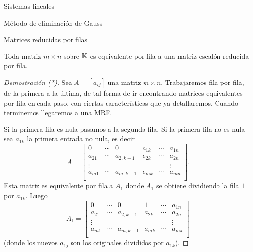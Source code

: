 \begin{chapter}{Sistemas lineales}
\begin{section}{Método de eliminación de Gauss }
\begin{subsection}{Matrices reducidas por filas}
                \begin{teorema}\label{th-merf}
                    Toda matriz $m \times n$ sobre $\mathbb K$ es equivalente por fila a una matriz escalón reducida por fila.
                \end{teorema}
                \begin{proof}[Demostración (*)]
                    Sea $A = [a_{ij}]$ una matriz $m \times n$. Trabajaremos fila por fila, de la primera a la última, de tal forma de ir encontrando matrices equivalentes por fila en cada paso, con ciertas características que ya detallaremos. Cuando terminemos llegaremos a una MRF.  
                    
                    Si la primera fila es nula pasamos a la segunda fila. Si la primera fila no es nula sea $a_{1k}$ la primera entrada no nula, es decir
                    \begin{equation*}
                    A = \begin{bmatrix}
                    0 & \cdots & 0 & a_{1k} & \cdots & a_{1n} \\
                    a_{21}& \cdots & a_{2,k-1} & a_{2k} & \cdots & a_{2n} \\
                    \vdots&  &  &  &  & \vdots \\
                    a_{m1}& \cdots & a_{m,k-1} & a_{mk} & \cdots & a_{mn} \\
                    \end{bmatrix}.
                    \end{equation*} 
                    Esta matriz es equivalente por fila a $A_1$ donde $A_1$ se obtiene dividiendo la fila $1$ por $a_{1k}$. Luego 
                    \begin{equation*}
                    A_1 = \begin{bmatrix}
                    0 & \cdots & 0 & 1 & \cdots & a_{1n} \\
                    a_{21}& \cdots & a_{2,k-1} & a_{2k} & \cdots & a_{2n} \\
                    \vdots&  &  &  &  & \vdots \\
                    a_{m1}& \cdots & a_{m,k-1} & a_{mk} & \cdots & a_{mn} \\
                    \end{bmatrix}
                    \end{equation*}
                    (donde los nuevos $a_{1j}$ son  los originales divididos por $a_{1k}$).  
                    

\end{proof}
\end{subsection}
\end{section}
\end{chapter}
